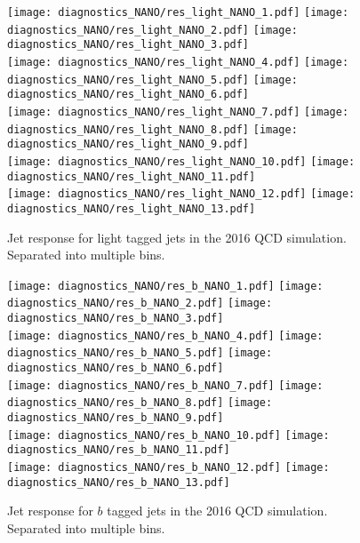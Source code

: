 \begin{figure}[!h]
	\begin{center}
  \texttt{[image: diagnostics\_NANO/res\_light\_NANO\_1.pdf]}
  \texttt{[image: diagnostics\_NANO/res\_light\_NANO\_2.pdf]} 
  \texttt{[image: diagnostics\_NANO/res\_light\_NANO\_3.pdf]} \\
  \texttt{[image: diagnostics\_NANO/res\_light\_NANO\_4.pdf]}
  \texttt{[image: diagnostics\_NANO/res\_light\_NANO\_5.pdf]} 
  \texttt{[image: diagnostics\_NANO/res\_light\_NANO\_6.pdf]} \\
  \texttt{[image: diagnostics\_NANO/res\_light\_NANO\_7.pdf]}
  \texttt{[image: diagnostics\_NANO/res\_light\_NANO\_8.pdf]} 
  \texttt{[image: diagnostics\_NANO/res\_light\_NANO\_9.pdf]} \\
  \texttt{[image: diagnostics\_NANO/res\_light\_NANO\_10.pdf]}
  \texttt{[image: diagnostics\_NANO/res\_light\_NANO\_11.pdf]} \\
  \texttt{[image: diagnostics\_NANO/res\_light\_NANO\_12.pdf]}     
  \texttt{[image: diagnostics\_NANO/res\_light\_NANO\_13.pdf]} \\      
	\end{center}
	\caption[Light Jet Response]{Jet response for light tagged jets in the 2016 QCD simulation. Separated into multiple \pt{} bins.
	 }
	\label{fig:qcd-light-jet-res}
\end{figure}

\begin{figure}[!h]
	\begin{center}  
  \texttt{[image: diagnostics\_NANO/res\_b\_NANO\_1.pdf]}
  \texttt{[image: diagnostics\_NANO/res\_b\_NANO\_2.pdf]} 
  \texttt{[image: diagnostics\_NANO/res\_b\_NANO\_3.pdf]} \\
  \texttt{[image: diagnostics\_NANO/res\_b\_NANO\_4.pdf]}
  \texttt{[image: diagnostics\_NANO/res\_b\_NANO\_5.pdf]} 
  \texttt{[image: diagnostics\_NANO/res\_b\_NANO\_6.pdf]} \\
  \texttt{[image: diagnostics\_NANO/res\_b\_NANO\_7.pdf]}
  \texttt{[image: diagnostics\_NANO/res\_b\_NANO\_8.pdf]} 
  \texttt{[image: diagnostics\_NANO/res\_b\_NANO\_9.pdf]} \\
  \texttt{[image: diagnostics\_NANO/res\_b\_NANO\_10.pdf]}
  \texttt{[image: diagnostics\_NANO/res\_b\_NANO\_11.pdf]} \\
  \texttt{[image: diagnostics\_NANO/res\_b\_NANO\_12.pdf]} 
  \texttt{[image: diagnostics\_NANO/res\_b\_NANO\_13.pdf]} \\ 
	\end{center}
	\caption[B Jet Response]{Jet response for $b$ tagged jets in the 2016 QCD simulation. Separated into multiple \pt{} bins.
	 }
	\label{fig:qcd-b-jet-res}
\end{figure}
